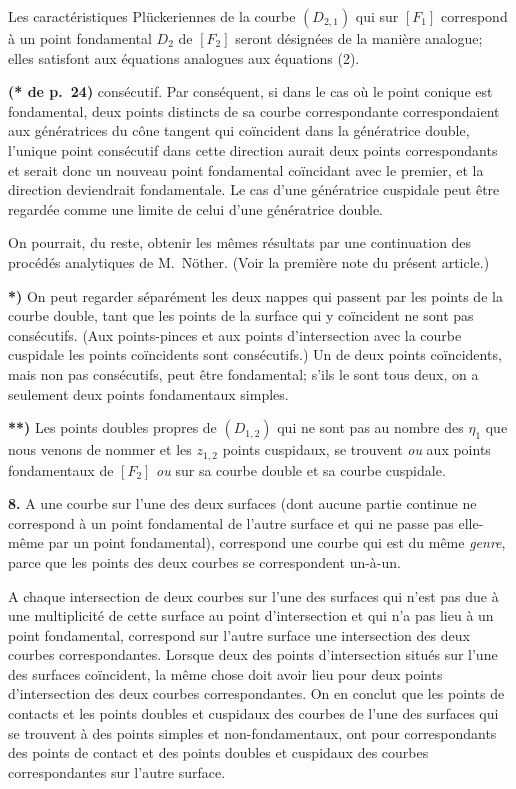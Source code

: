 \documentclass{article}
\begin{document}
Les caractéristiques Plückeriennes de la courbe $(D_{2, 1})$ qui sur $[F_1]$ correspond à un point fondamental $D_2$ de $[F_2]$ seront désignées de la manière analogue; elles satisfont aux équations analogues aux équations (2).

\textbf{(* de p.~24)} consécutif. Par conséquent, si dans le cas où le point conique est fondamental, deux points distincts de sa courbe correspondante correspondaient aux génératrices du cône tangent qui coïncident dans la génératrice double, l'unique point consécutif dans cette direction aurait deux points correspondants et serait donc un nouveau point fondamental coïncidant avec le premier, et la direction deviendrait fondamentale. Le cas d'une génératrice cuspidale peut être regardée comme une limite de celui d'une génératrice double.

On pourrait, du reste, obtenir les mêmes résultats par une continuation des procédés analytiques de M.~Nöther. (Voir la première note du présent article.)

\textbf{*)} On peut regarder séparément les deux nappes qui passent par les points de la courbe double, tant que les points de la surface qui y coïncident ne sont pas consécutifs. (Aux points-pinces et aux points d'intersection avec la courbe cuspidale les points coïncidents sont consécutifs.) Un de deux points coïncidents, mais non pas consécutifs, peut être fondamental; s'ils le sont tous deux, on a seulement deux points fondamentaux simples.

\textbf{**)} Les points doubles propres de $(D_{1, 2})$ qui ne sont pas au nombre des $\eta_1$ que nous venons de nommer et les $z_{1, 2}$ points cuspidaux, se trouvent \emph{ou} aux points fondamentaux de $[F_2]$ \emph{ou} sur sa courbe double et sa courbe cuspidale.

\textbf{8.} A une courbe sur l'une des deux surfaces (dont aucune partie continue ne correspond à un point fondamental de l'autre surface et qui ne passe pas elle-même par un point fondamental), correspond une courbe qui est du même \emph{genre}, parce que les points des deux courbes se correspondent un-à-un.

A chaque intersection de deux courbes sur l'une des surfaces qui n'est pas due à une multiplicité de cette surface au point d'intersection et qui n'a pas lieu à un point fondamental, correspond sur l'autre surface une intersection des deux courbes correspondantes. Lorsque deux des points d'intersection situés sur l'une des surfaces coïncident, la même chose doit avoir lieu pour deux points d'intersection des deux courbes correspondantes. On en conclut que les points de contacts et les points doubles et cuspidaux des courbes de l'une des surfaces qui se trouvent à des points simples et non-fondamentaux, ont pour correspondants des points de contact et des points doubles et cuspidaux des courbes correspondantes sur l'autre surface.
\end{document}
